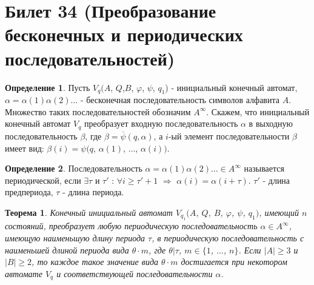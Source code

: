 \documentclass[a4paper, 12pt]{article}
\renewcommand{\phi}{\varphi}
\theoremstyle{definition}
\newtheorem*{definition}{Определение}
\theoremstyle{plain}
\newtheorem*{theorem}{Теорема}
\theoremstyle{remark}
\begin{document}
  \section{Билет 34 (Преобразование бесконечных и периодических последовательностей)}
  \begin{definition}
    Пусть $V_q(A$, $Q$,$B$, $\phi$, $\psi$, $q_1$) - инициальный конечный автомат, $\alpha=\alpha(1)\alpha(2)\ldots$ - бесконечная последовательность символов алфавита $A$. Множество таких последовательностей обозначим $A^{\infty}$. Скажем, что инициальный конечный автомат $V_q$ преобразует входную последовательность $\alpha$ в выходную последовательность $\beta$, где $\beta=\overline{\psi}(q,\alpha)$, а $i$-ый элемент последовательности $\beta$ имеет вид: $\beta(i)=\psi(q$, $\alpha(1)$, $\ldots$, $\alpha(i))$.
  \end{definition}
  \begin{definition}
    Последовательность $\alpha=\alpha(1)\alpha(2)\ldots\in A^{\infty}$ называется периодической, если $\exists\tau$ и $\tau'$ : $\forall i\geqslant\tau'+1$ $\Longrightarrow$ $\alpha(i)=\alpha(i+\tau)$. $\tau'$ - длина предпериода, $\tau$ - длина периода.
  \end{definition}
  \begin{theorem}
    Конечный инициальный автомат $V_{q_1}(A$, $Q$, $B$, $\phi$, $\psi$, $q_1)$, имеющий $n$ состояний, преобразует любую периодическую последовательность $\alpha\in A^{\infty}$, имеющую наименьшую длину периода $\tau$, в периодическую последовательность с наименьшей длиной периода вида $\theta\cdot m$, где $\theta|\tau$, $m\in \{1$, $\ldots$, $n\}$. Если $|A|\geqslant3$ и $|B|\geqslant2$, то каждое такое значение вида $\theta\cdot m$ достигается при некотором автомате $V_q$ и соответствующей последовательности $\alpha$.
  \end{theorem}
\end{document}
